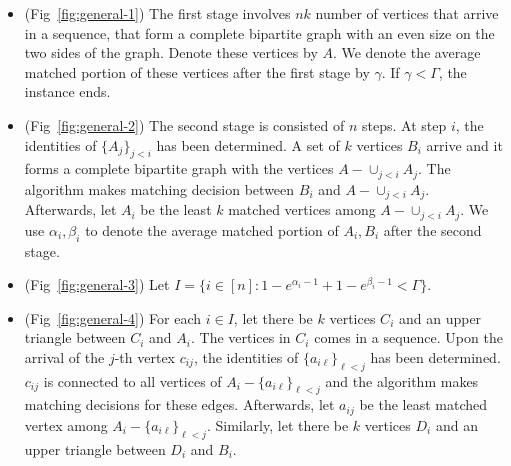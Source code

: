 \begin{itemize}
    \item (Fig~\ref{fig:general-1}) The first stage involves $nk$ number of vertices that arrive in a sequence, that form a complete bipartite graph with an even size on the two sides of the graph. Denote these vertices by $A$. We denote the average matched portion of these vertices after the first stage by $\gamma$. If $\gamma < \Gamma$, the instance ends.
    \item (Fig~\ref{fig:general-2}) The second stage is consisted of $n$ steps. At step $i$, the identities of $\{A_{j}\}_{j<i}$ has been determined. A set of $k$ vertices $B_i$ arrive and it forms a complete bipartite graph with the vertices $A - \cup_{j<i}A_j$. The algorithm makes matching decision between $B_i$ and $A - \cup_{j<i}A_j$. Afterwards, let $A_i$ be the least $k$ matched vertices among $A - \cup_{j<i}A_j$. We use $\alpha_i,\beta_i$ to denote the average matched portion of $A_i,B_i$ after the second stage.
    \item (Fig~\ref{fig:general-3}) Let $I=\{i \in [n]:1-e^{\alpha_i-1} + 1 - e^{\beta_i-1} < \Gamma\}$.
    \item (Fig~\ref{fig:general-4}) For each $i \in I$, let there be $k$ vertices $C_i$ and an upper triangle between $C_i$ and $A_i$. The vertices in $C_i$ comes in a sequence. Upon the arrival of the $j$-th vertex $c_{ij}$, the identities of $\{a_{i\ell}\}_{\ell<j}$ has been determined. $c_{ij}$ is connected to all vertices of $A_i - \{a_{i\ell}\}_{\ell<j}$ and the algorithm makes matching decisions for these edges. Afterwards, let $a_{ij}$ be the least matched vertex among $A_i - \{a_{i\ell}\}_{\ell<j}$. Similarly, let there be $k$ vertices $D_i$ and an upper triangle between $D_i$ and $B_i$.
\end{itemize}

